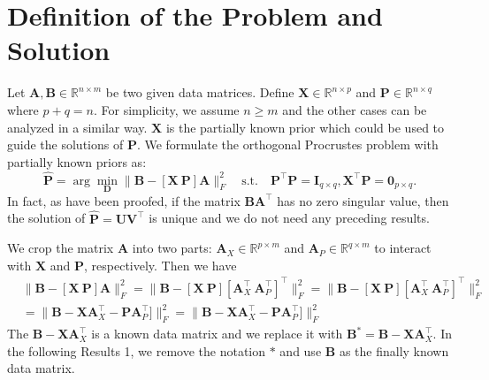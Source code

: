 \documentclass[titlepage,11pt,twoside]{article}
\begin{document}
\section{Definition of the Problem and Solution}
Let $\mathbf{A},\mathbf{B}\in \mathbb{R}^{n\times m}$ be two given data matrices. Define $\mathbf{X}\in\mathbb{R}^{n\times p}$ and $\mathbf{P}\in\mathbb{R}^{n\times q}$ where $p+q=n$. For simplicity, we assume $n\ge m$ and the other cases can be analyzed in a similar way. $\mathbf{X}$ is the partially known prior which could be used to guide the solutions of $\mathbf{P}$. We formulate the orthogonal Procrustes problem with partially known priors as:
\begin{equation}
\mathbf{\hat{P}}=\arg\min_{\mathbf{D}}\|\mathbf{B}-[\mathbf{X}\ \mathbf{P}]\mathbf{A}\|_{F}^{2}
\quad
\text{s.t.}
\quad
\mathbf{P}^{\top}\mathbf{P} = \mathbf{I}_{q\times q}, \mathbf{X}^{\top}\mathbf{P} = \mathbf{0}_{p\times q}.
\end{equation} 
In fact, as have been proofed, if the matrix $\mathbf{\mathbf{B}\mathbf{A}^{\top}}$ has no zero singular value, then the solution of  
$\mathbf{\hat{P}} = \mathbf{U}\mathbf{V}^{\top}$ is unique and we do not need any preceding results.

We crop the matrix $\mathbf{A}$ into two parts: $\mathbf{A}_{X}\in\mathbb{R}^{p\times m}$ and $\mathbf{A}_{P}\in\mathbb{R}^{q\times m}$ to interact with $\mathbf{X}$ and $\mathbf{P}$, respectively. Then we have 
\begin{equation}
\begin{split}
&
\|\mathbf{B}-[\mathbf{X}\ \mathbf{P}]\mathbf{A}\|_{F}^{2}
=\|\mathbf{B}-[\mathbf{X}\ \mathbf{P}][\mathbf{A}_{X}^{\top}\ \mathbf{A}_{P}^{\top}]^{\top}\|_{F}^{2}
=\|\mathbf{B}-[\mathbf{X}\ \mathbf{P}][\mathbf{A}_{X}^{\top}\ \mathbf{A}_{P}^{\top}]^{\top}\|_{F}^{2}
\\
&
=\|\mathbf{B}-\mathbf{X}\mathbf{A}_{X}^{\top} - \mathbf{P}\mathbf{A}_{P}^{\top}]\|_{F}^{2}
=\|\mathbf{B}-\mathbf{X}\mathbf{A}_{X}^{\top} - \mathbf{P}\mathbf{A}_{P}^{\top}]\|_{F}^{2}
\end{split}
\end{equation}
The $\mathbf{B}-\mathbf{X}\mathbf{A}_{X}^{\top}$ is a known data matrix and we replace it with 
$\mathbf{B}^{*}=\mathbf{B}-\mathbf{X}\mathbf{A}_{X}^{\top}$. In the following Results 1, we remove the notation $*$ and use $\mathbf{B}$ as the finally known data matrix.
\end{document}
